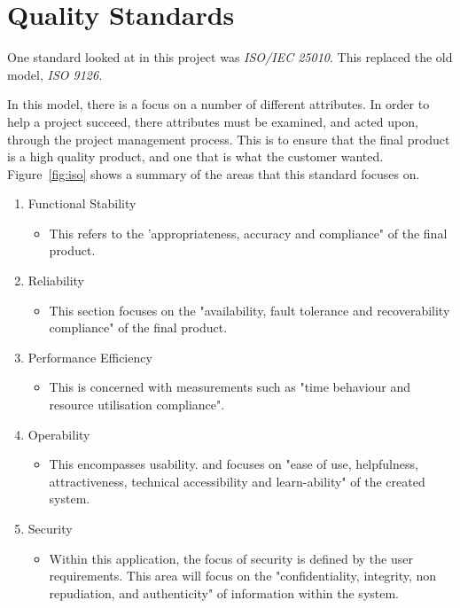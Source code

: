 \section{Quality Standards}

One standard looked at in this project was \textit{ISO/IEC 25010}. This replaced the old model, \textit{ISO 9126}.

In this model, there is a focus on a number of different attributes. In order to help a project succeed, there attributes must be examined, and acted upon, through the project management process. This is to ensure that the final product is a high quality product, and one that is what the customer wanted. Figure~\ref{fig:iso} shows a summary of the areas that this standard focuses on. 

\begin{enumerate}
\item Functional Stability
\begin{itemize}
\item This refers to the 'appropriateness, accuracy and compliance" of the final product. \parencite{iso}
\end{itemize}

\item Reliability
\begin{itemize}
\item This section focuses on the "availability, fault tolerance and recoverability compliance" of the final product. \parencite{iso}
\end{itemize}

\item Performance Efficiency
\begin{itemize}
\item This is concerned with measurements such as "time behaviour and resource utilisation compliance". \parencite{iso}
\end{itemize}

\item Operability
\begin{itemize}
\item This encompasses usability. and focuses on "ease of use, helpfulness, attractiveness, technical accessibility and learn-ability" of the created system. \parencite{iso}
\end{itemize}

\item Security
\begin{itemize}
\item Within this application, the focus of security is defined by the user requirements. This area will focus on the "confidentiality, integrity, non repudiation, and authenticity" of information within the system.
\end{itemize}


\end{enumerate}
